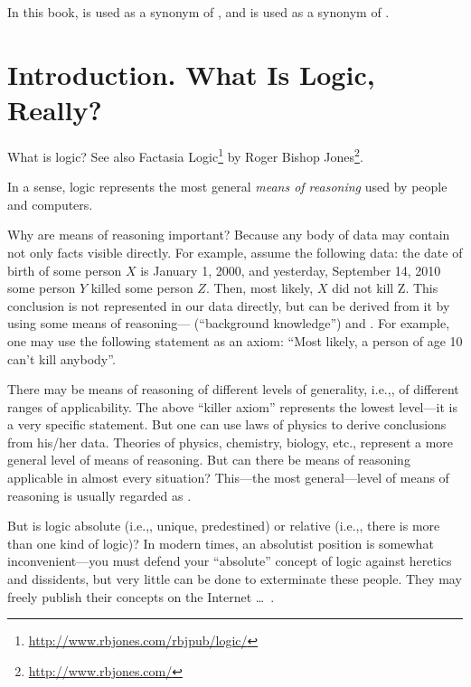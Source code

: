 \begin{remark}
In this book,  is used as a synonym of , and  is used as a synonym of .
\end{remark}

\section{Introduction. What Is Logic, Really?}

What is logic?
See also Factasia Logic\footnote{\url{http://www.rbjones.com/rbjpub/logic/}} by Roger Bishop Jones\footnote{\url{http://www.rbjones.com/}}.

In a sense, logic represents the most general \emph{means of reasoning} used by people and computers.

Why are means of reasoning important?
Because any body of data may contain not only facts visible directly.
For example, assume the following data: the date of birth of some person \(X\) is January 1, 2000,
and yesterday, September 14, 2010 some person \(Y\) killed some person \(Z\).
Then, most likely, \(X\) did not kill Z.
This conclusion is not represented in our data directly, but can be derived from it by using some means of reasoning--- (``background knowledge'') and .
For example, one may use the following statement as an axiom: ``Most likely, a person of age 10 can't kill anybody''.

There may be means of reasoning of different levels of generality, i.e.,, of different ranges of applicability.
The above ``killer axiom'' represents the lowest level---it is a very specific statement.
But one can use laws of physics to derive conclusions from his/her data.
Theories of physics, chemistry, biology, etc., represent a more general level of means of reasoning.
But can there be means of reasoning applicable in almost every situation?
This---the most general---level of means of reasoning is usually regarded as .

But is logic absolute (i.e.,, unique, predestined) or relative (i.e.,, there is more than one kind of logic)?
In modern times, an absolutist position is somewhat inconvenient---you must defend your ``absolute'' concept of logic against heretics and dissidents, but very little can be done to exterminate these people.
They may freely publish their concepts on the Internet \ldots~.

